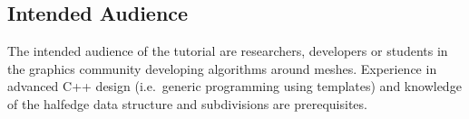 \documentclass[letter]{article}
\begin{document}
\subsection*{Intended Audience}
The intended audience of the tutorial are researchers, 
developers or students in the graphics community developing 
algorithms around meshes. Experience in advanced C++
design (i.e.\ generic programming using templates) and
knowledge of the halfedge data structure and 
subdivisions are prerequisites. 
\end{document}

